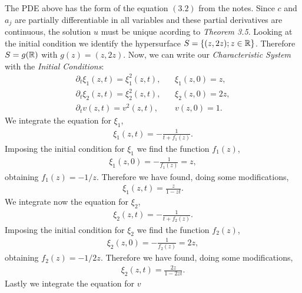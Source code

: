 \begin{questions}


\begin{solution}
The PDE above has the form of the equation $(3.2)$ from the notes. Since $c$ and $a_j$ are partially differentiable in all variables and these partial derivatives are continuous, the solution $u$ must be unique acording to \textsl{Theorem 3.5}. Looking at the initial condition we identify the hypersurface $S=\{(z,2z);z\in\mathbb{R}\}$. Therefore $S=g(\mathbb{R})$ with $g(z)=(z,2z)$. Now, we can write our \textit{Characteristic System} with the \textit{Initial Conditions}:
\begin{align*}
\partial_t\xi_1(z,t)=\xi_1^2(z,t),~~&~~\xi_1(z,0)=z,\\
\partial_t\xi_2(z,t)=\xi_2^2(z,t),~~&~~\xi_2(z,0)=2z,\\
\partial_tv(z,t)=v^2(z,t),~~&~~v(z,0)=1.
\end{align*}
We integrate the equation for $\xi_1$,
\begin{align*}
\xi_1(z,t)=-\frac{1}{t+f_1(z)}.
\end{align*}
Imposing the initial condition for $\xi_1$ we find the function $f_1(z)$,
\begin{align*}
\xi_1(z,0)=-\frac{1}{f_1(z)}=z,
\end{align*}
obtaining $f_1(z)=-1/z$. Therefore we have found, doing some modifications,
\begin{align*}
\xi_1(z,t)=\frac{z}{1-zt}.
\end{align*}
We integrate now the equation for $\xi_2$,
\begin{align*}
\xi_2(z,t)=-\frac{1}{t+f_2(z)}.
\end{align*}
Imposing the initial condition for $\xi_2$ we find the function $f_2(z)$,
\begin{align*}
\xi_2(z,0)=-\frac{1}{f_2(z)}=2z,
\end{align*}
obtaining $f_2(z)=-1/2z$. Therefore we have found, doing some modifications,
\begin{align*}
\xi_2(z,t)=\frac{2z}{1-2zt}.
\end{align*}
Lastly we integrate the equation for $v$
\begin{align*}

\end{align*}
\end{solution}
\end{questions}
